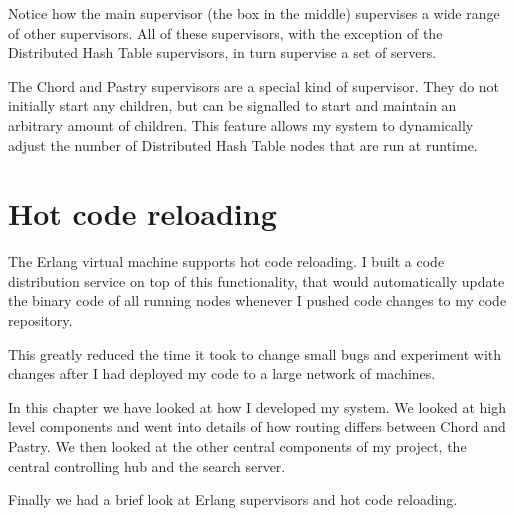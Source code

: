 Notice how the main supervisor (the box in the middle) supervises a wide range of other supervisors. All of these supervisors, with the exception of the Distributed Hash Table supervisors, in turn supervise a set of servers.

The Chord and Pastry supervisors are a special kind of supervisor. They do not initially start any children, but can be signalled to start and maintain an arbitrary amount of children. This feature allows my system to dynamically adjust the number of Distributed Hash Table nodes that are run at runtime.


\section{Hot code reloading}
The Erlang virtual machine supports hot code reloading.
I built a code distribution service on top of this functionality, that would automatically update the binary code of all running nodes whenever I pushed code changes to my code repository.

This greatly reduced the time it took to change small bugs and experiment with changes after I had deployed my code to a large network of machines.

\mbox{}

In this chapter we have looked at how I developed my system. We looked at high level components and went into details of how routing differs between Chord and Pastry. We then looked at the other central components of my project, the central controlling hub and the search server.

Finally we had a brief look at Erlang supervisors and hot code reloading.
